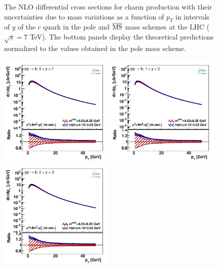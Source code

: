 \documentclass[12pt,a4paper]{article}
\newcommand{\msbar}{\ensuremath{\overline{\rm MS}}\xspace}
\begin{document}
\begin{figure}
    \caption{The NLO differential cross sections for charm production with their uncertainties due to mass variations as a function of $p_T$ in intervals of $y$ of the $c$ quark in the pole and \msbar mass schemes at the LHC ($\sqrt{s} = 7$ TeV). The bottom panels display the theoretical predictions normalized to the values obtained in the pole mass scheme.}
    \label{fig:c-pty-mass}
\end{figure}

\begin{figure}
    \centering
    \includegraphics[width=0.49\textwidth]{figs/parton-b/dyn-therr-mass/data_401-1.pdf}
    \includegraphics[width=0.49\textwidth]{figs/parton-b/dyn-therr-mass/data_401-2.pdf}
    \includegraphics[width=0.49\textwidth]{figs/parton-b/dyn-therr-mass/data_401-3.pdf}

\end{figure}
\end{document}
